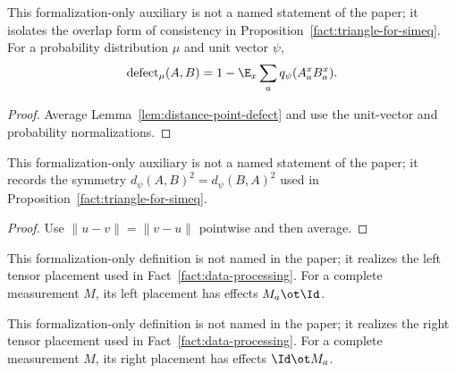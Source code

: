 \begin{lemma}
	\label{lem:distance-defect-overlap}
	\leanok
	This formalization-only auxiliary is not a named statement of the paper; it
	isolates the overlap form of consistency in
	Proposition~\ref{fact:triangle-for-simeq}. For a probability distribution
	$\mu$ and unit vector $\psi$,
	\[
		\operatorname{defect}_\mu(A,B)
		=1-\E_x\sum_aq_\psi(A^x_aB^x_a).
	\]
\end{lemma}
\begin{proof}
	\leanok
	Average Lemma~\ref{lem:distance-point-defect} and use the unit-vector and
	probability normalizations.
\end{proof}

\begin{lemma}
	\label{lem:distance-symmetry}
	\leanok
	This formalization-only auxiliary is not a named statement of the paper; it
	records the symmetry $d_\psi(A,B)^2=d_\psi(B,A)^2$ used in
	Proposition~\ref{fact:triangle-for-simeq}.
\end{lemma}
\begin{proof}
	\leanok
	Use $\|u-v\|=\|v-u\|$ pointwise and then average.
\end{proof}

\begin{definition}
	\label{def:distance-left-placed-measurement}
	\leanok
	This formalization-only definition is not named in the paper; it realizes the
	left tensor placement used in Fact~\ref{fact:data-processing}. For a complete
	measurement $M$, its left placement has effects $M_a\ot\Id$.
\end{definition}

\begin{definition}
	\label{def:distance-right-placed-measurement}
	\leanok
	This formalization-only definition is not named in the paper; it realizes the
	right tensor placement used in Fact~\ref{fact:data-processing}. For a
	complete measurement $M$, its right placement has effects $\Id\ot M_a$.
\end{definition}

